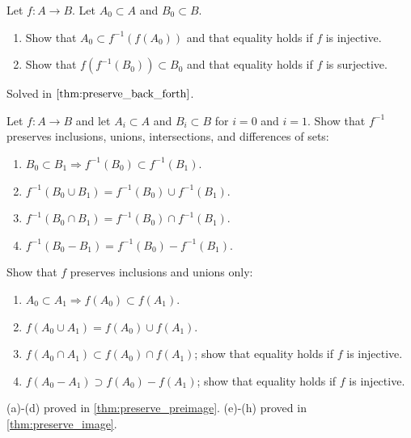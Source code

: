   \begin{exercise}[Munkres 2.1]
    Let $f: A \to B$. Let $A_0 \subset A$ and $B_0 \subset B$.
    \begin{enumerate}
      \item Show that $A_0 \subset f^{-1}(f(A_0))$ and that equality holds if $f$ is injective.
      \item Show that $f(f^{-1}(B_0)) \subset B_0$ and that equality holds if $f$ is surjective.
    \end{enumerate}
  \end{exercise}
  \begin{solution}
    Solved in $\ref{thm:preserve_back_forth}$. 
  \end{solution}

  \begin{exercise}[Munkres 2.2]
    Let $f: A \to B$ and let $A_i \subset A$ and $B_i \subset B$ for $i = 0$ and $i = 1$. Show that $f^{-1}$ preserves inclusions, unions, intersections, and differences of sets:
    \begin{enumerate}
      \item[a)] $B_0 \subset B_1 \Rightarrow f^{-1}(B_0) \subset f^{-1}(B_1)$.
      \item[b)] $f^{-1}(B_0 \cup B_1) = f^{-1}(B_0) \cup f^{-1}(B_1)$.
      \item[c)] $f^{-1}(B_0 \cap B_1) = f^{-1}(B_0) \cap f^{-1}(B_1)$.
      \item[d)] $f^{-1}(B_0 - B_1) = f^{-1}(B_0) - f^{-1}(B_1)$.
    \end{enumerate}
    Show that $f$ preserves inclusions and unions only:
    \begin{enumerate}[resume]
      \item[e)] $A_0 \subset A_1 \Rightarrow f(A_0) \subset f(A_1)$.
      \item[f)] $f(A_0 \cup A_1) = f(A_0) \cup f(A_1)$.
      \item[g)] $f(A_0 \cap A_1) \subset f(A_0) \cap f(A_1)$; show that equality holds if $f$ is injective.
      \item[h)] $f(A_0 - A_1) \supset f(A_0) - f(A_1)$; show that equality holds if $f$ is injective.
    \end{enumerate}
  \end{exercise}
  \begin{solution}
     (a)-(d) proved in \ref{thm:preserve_preimage}. (e)-(h) proved in \ref{thm:preserve_image}.  
  \end{solution}

